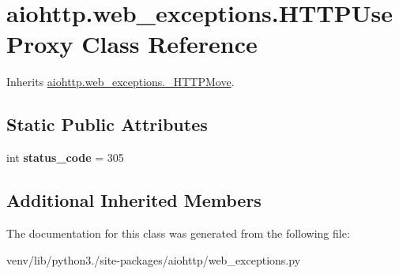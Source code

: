 \hypertarget{classaiohttp_1_1web__exceptions_1_1_h_t_t_p_use_proxy}{}\section{aiohttp.\+web\+\_\+exceptions.\+H\+T\+T\+P\+Use\+Proxy Class Reference}
\label{classaiohttp_1_1web__exceptions_1_1_h_t_t_p_use_proxy}


Inherits \hyperlink{classaiohttp_1_1web__exceptions_1_1___h_t_t_p_move}{aiohttp.\+web\+\_\+exceptions.\+\_\+\+H\+T\+T\+P\+Move}.

\subsection*{Static Public Attributes}
\begin{DoxyCompactItemize}
\item 
\mbox{\label{classaiohttp_1_1web__exceptions_1_1_h_t_t_p_use_proxy_ae8474f538fb6f41fccdd94d7ab1afc58}} 
int {\bfseries status\+\_\+code} = 305
\end{DoxyCompactItemize}
\subsection*{Additional Inherited Members}


The documentation for this class was generated from the following file\+:\begin{DoxyCompactItemize}
\item 
venv/lib/python3./site-\/packages/aiohttp/web\+\_\+exceptions.\+py\end{DoxyCompactItemize}
